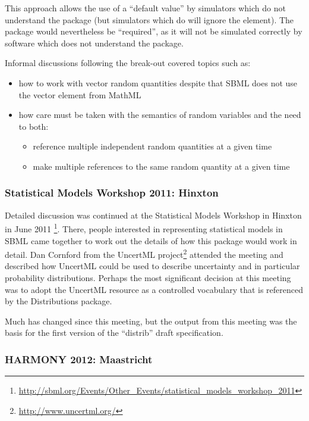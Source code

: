 \documentclass[draftspec]{sbmlpkgspec}
\newcommand{\distrib}{Distributions\xspace}
\newcommand{\uncertml}{UncertML\xspace}
\begin{document}
This approach allows the use of a ``default value'' by simulators which do not
understand the package (but simulators which do will ignore the 
element). The package would nevertheless be ``required'', as it will not
be simulated correctly by software which does not understand the
package.

Informal discussions following the break-out covered topics such as:

\begin{itemize}
\item how to work with vector random quantities despite that SBML does not use the vector element from MathML
\item how care must be taken with the semantics of random variables
  and the need to both:
\begin{itemize}
\item reference multiple independent random quantities at a given
  time
\item make multiple references to the same random quantity at a given
time
\end{itemize}
\end{itemize}

\subsubsection{Statistical Models Workshop 2011: Hinxton}

Detailed discussion was continued at the Statistical Models Workshop
in Hinxton in June 2011%
\footnote{\url{http://sbml.org/Events/Other_Events/statistical_models_workshop_2011}}. There,
people interested in representing statistical models in SBML came
together to work out the details of how this package would work in
detail. Dan Cornford from the \uncertml
project\footnote{\url{http://www.uncertml.org/}} attended the meeting
and described how UncertML could be used to describe uncertainty
and in particular probability distributions. Perhaps the most
significant decision at this meeting was to adopt the \uncertml
resource as a controlled vocabulary that is referenced by the \distrib package.

Much has changed since this meeting, but the output from this meeting
was the basis for the first version of the ``distrib'' draft specification.


\subsubsection{HARMONY 2012: Maastricht}
\end{document}
